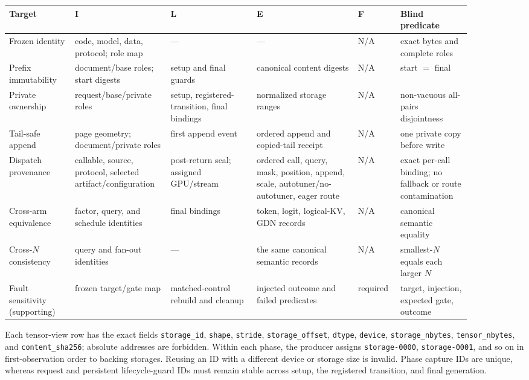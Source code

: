 \documentclass{article}
\begin{document}
\begin{center}
\scriptsize
\setlength{\tabcolsep}{2.5pt}
\begin{tabular}{@{}p{0.13\linewidth}p{0.17\linewidth}p{0.17\linewidth}p{0.20\linewidth}p{0.08\linewidth}p{0.14\linewidth}@{}}
\toprule
Target & I & L & E & F & Blind predicate \\
\midrule
Frozen identity & code, model, data, protocol; role map & --- & --- & N/A & exact bytes and complete roles \\
Prefix immutability & document/base roles; start digests & setup and final guards & canonical content digests & N/A & start $=$ final \\
Private ownership & request/base/private roles & setup, registered-transition, final bindings & normalized storage ranges & N/A & non-vacuous all-pairs disjointness \\
Tail-safe append & page geometry; document/private roles & first append event & ordered append and copied-tail receipt & N/A & one private copy before write \\
Dispatch provenance & callable, source, protocol, selected artifact/configuration & post-return seal; assigned GPU/stream & ordered call, query, mask, position, append, scale, autotuner/no-autotuner, eager route & N/A & exact per-call binding; no fallback or route contamination \\
Cross-arm equivalence & factor, query, and schedule identities & final bindings & token, logit, logical-KV, GDN records & N/A & canonical semantic equality \\
Cross-$N$ consistency & query and fan-out identities & --- & the same canonical semantic records & N/A & smallest-$N$ equals each larger $N$ \\
Fault sensitivity (supporting) & frozen target/gate map & matched-control rebuild and cleanup & injected outcome and failed predicates & required & target, injection, expected gate, outcome \\
\bottomrule
\end{tabular}
\end{center}

Each tensor-view row has the exact fields
\texttt{storage\_id}, \texttt{shape}, \texttt{stride},
\texttt{storage\_offset}, \texttt{dtype}, \texttt{device},
\texttt{storage\_nbytes}, \texttt{tensor\_nbytes}, and
\texttt{content\_sha256}; absolute addresses are forbidden.  Within each
phase, the producer assigns \texttt{storage-0000}, \texttt{storage-0001},
and so on in first-observation order to backing storages.  Reusing an ID with
a different device or storage size is invalid.  Phase capture IDs are unique,
whereas request and persistent lifecycle-guard IDs must remain stable across
setup, the registered transition, and final generation.
\end{document}
